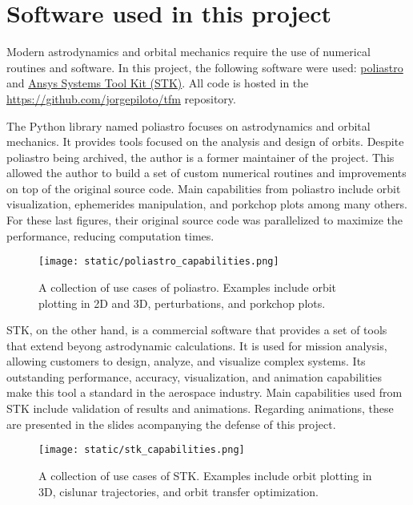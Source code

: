 \section{Software used in this project}

Modern astrodynamics and orbital mechanics require the use of numerical routines
and software. In this project, the following software were used:
\href{https://github.com/poliastro/poliastro}{poliastro} and
\href{https://www.ansys.com/products/missions/ansys-stk}{Ansys Systems Tool Kit
(STK)}. All code is hosted in the
\href{https://github.com/jorgepiloto/tfm}{https://github.com/jorgepiloto/tfm}
repository.

The Python library named poliastro focuses on astrodynamics and orbital
mechanics. It provides tools focused on the analysis and design of orbits.
Despite poliastro being archived, the author is a former maintainer of the
project. This allowed the author to build a set of custom numerical routines and
improvements on top of the original source code. Main capabilities from
poliastro include orbit visualization, ephemerides manipulation, and porkchop
plots among many others. For these last figures, their original source code was
parallelized to maximize the performance, reducing computation times.

\vspace{1cm}
\begin{figure}[H] \centering
  \texttt{[image: static/poliastro\_capabilities.png]}
  \caption[A collection of use cases of poliastro.]{A collection of use
    cases of poliastro. Examples include orbit plotting in 2D and 3D,
    perturbations, and porkchop plots.}
  \label{fig:poliastro_capabilities}
\end{figure}

STK, on the other hand, is a commercial software that provides a set of tools
that extend beyong astrodynamic calculations. It is used for mission analysis,
allowing customers to design, analyze, and visualize complex systems. Its
outstanding performance, accuracy, visualization, and animation capabilities
make this tool a standard in the aerospace industry. Main capabilities used from
STK include validation of results and animations. Regarding animations, these
are presented in the slides acompanying the defense of this project.

\vspace{1cm}
\begin{figure}[H] \centering
  \texttt{[image: static/stk\_capabilities.png]}
  \caption[A collection of use cases of STK.]{A collection of use
    cases of STK. Examples include orbit plotting in 3D, cislunar
    trajectories, and orbit transfer optimization.}
  \label{fig:stk_capabilities}
\end{figure}
